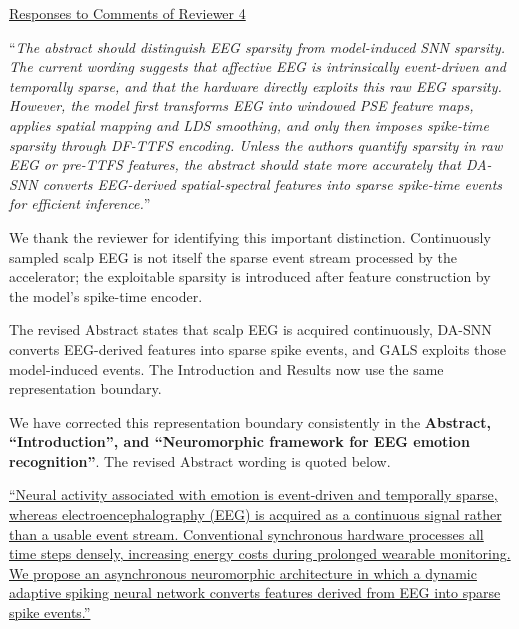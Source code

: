 \documentclass[12pt,technote,onecolumn]{IEEEtran}
\begin{document}
\EvidenceSuppTableSNine
\EvidenceSuppTableSThirteen

\newpage
\clearpage
\begin{center}
\underline{Responses to Comments of Reviewer 4}
\end{center}
\vspace{3mm}

\vspace{4mm}

``{\it The abstract should distinguish EEG sparsity from model-induced SNN
sparsity.\\
The current wording suggests that affective EEG is intrinsically
event-driven and temporally sparse, and that the hardware directly
exploits this raw EEG sparsity. However, the model first transforms EEG
into windowed PSE feature maps, applies spatial mapping and LDS
smoothing, and only then imposes spike-time sparsity through DF-TTFS
encoding. Unless the authors quantify sparsity in raw EEG or pre-TTFS
features, the abstract should state more accurately that DA-SNN converts
EEG-derived spatial-spectral features into sparse spike-time events for
efficient inference.}''
\vspace{1mm}


We thank the reviewer for identifying this important distinction. Continuously sampled scalp EEG is not itself the sparse event stream processed by the accelerator; the exploitable sparsity is introduced after feature construction by the model's spike-time encoder.

The revised Abstract states that scalp EEG is acquired continuously,
DA-SNN converts EEG-derived features into sparse spike events, and GALS
exploits those model-induced events. The Introduction and Results now
use the same representation boundary.



We have corrected this representation boundary consistently in the \textbf{Abstract, ``Introduction'', and ``Neuromorphic framework for EEG emotion recognition''}. The revised Abstract wording is quoted below.

\uline{``Neural activity associated with emotion is event-driven and temporally sparse, whereas electroencephalography (EEG) is acquired as a continuous signal rather than a usable event stream. Conventional synchronous hardware processes all time steps densely, increasing energy costs during prolonged wearable monitoring. We propose an asynchronous neuromorphic architecture in which a dynamic adaptive spiking neural network converts features derived from EEG into sparse spike events.''}
\end{document}
